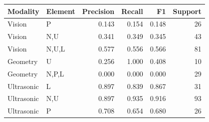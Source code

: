 \begin{tabular}{@{}llrrrr@{}}
\toprule
Modality & Element & Precision & Recall & F1 & Support \\
\midrule
Vision & {P} & 0.143 & 0.154 & 0.148 & 26 \\
Vision & {N,U} & 0.341 & 0.349 & 0.345 & 43 \\
Vision & {N,U,L} & 0.577 & 0.556 & 0.566 & 81 \\
\midrule
Geometry & {U} & 0.256 & 1.000 & 0.408 & 10 \\
Geometry & {N,P,L} & 0.000 & 0.000 & 0.000 & 29 \\
\midrule
Ultrasonic & {L} & 0.897 & 0.839 & 0.867 & 31 \\
Ultrasonic & {N,U} & 0.897 & 0.935 & 0.916 & 93 \\
Ultrasonic & {P} & 0.708 & 0.654 & 0.680 & 26 \\
\bottomrule
\end{tabular}
